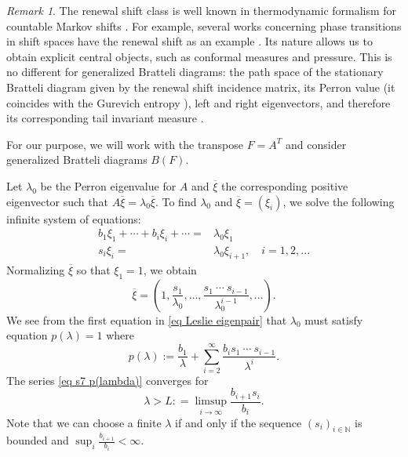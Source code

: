 \documentclass[11pt,reqno]{amsart}
\theoremstyle{definition}
\theoremstyle{remark}
\newtheorem{remark}[definition]{Remark}
\theoremstyle{plain}
\def\ol{\overline}
\newcommand{\N}{\mathbb N}
\newcommand{\be}{\begin{equation}}
\newcommand{\ee}{\end{equation}}
\newcommand{\ba}{\begin{aligned}}
\newcommand{\ea}{\end{aligned}}
\numberwithin{equation}{section}
\begin{document}
\begin{remark}
The renewal shift class \cite{Iommi2006} is well known in thermodynamic formalism for countable Markov shifts \cite{SarigTFCMS}. For example, several works concerning phase transitions in shift spaces have the renewal shift as an example \cite{Beltran_2021, BEFR2022, Raszeja2021, Sarig2001PT}. Its nature allows us to obtain explicit central objects, such as conformal measures and pressure. This is no different for generalized Bratteli diagrams: the path space of the stationary Bratteli diagram given by the renewal shift incidence matrix, its Perron value (it coincides with the Gurevich entropy \cite{Gurevichtopological1969, Gurevichshift1970}), left and right eigenvectors, and therefore its corresponding tail invariant measure \cite{BezuglyiJorgensenKarpelSanadhya2025}.
\end{remark}



For our purpose, we will work with the transpose $F = A^{T}$ and consider generalized Bratteli diagrams $B(F)$. 

Let $\lambda_0$ be the Perron eigenvalue for $A$ and $\ol \xi$ the corresponding positive eigenvector such that $A\ol\xi = \lambda_0 \ol\xi$. To find $\lambda_0$ and $\ol\xi = (\xi_i)$, we solve the following infinite system of equations:
\be\label{eq Leslie eigenpair}
\ba 
b_1 \xi_1 + \cdots + b_i \xi_i + \cdots = & \lambda_0 \xi_1\\
s_i \xi_i = & \lambda_0 \xi_{i+1}, \quad i = 1, 2, ...
\ea
\ee
Normalizing $\ol\xi$ so that $\xi_1 =1$, we obtain
\be\label{eq xi for Leslie}
\ol\xi = \left(1, \frac{s_1}{\lambda_0}, \ldots, \frac{s_1\ \cdots \ s_{i-1}}{\lambda_0^{i-1}}, \ldots\right).
\ee
We see from the first equation in 
\eqref{eq Leslie eigenpair} that $\lambda_0$ must satisfy equation $p(\lambda) =1$ where 
\be\label{eq s7 p(lambda)}
p(\lambda) := \dfrac{b_1}{\lambda}+ \sum_{i=2}^\infty \frac{b_i s_1\ \cdots\ s_{i-1} }{\lambda^{i}}.
\ee
The series \eqref{eq s7 p(lambda)} converges for 
\begin{equation}\label{eq: lambda_L}
    \lambda > L: =\limsup_{i\to \infty} \dfrac{b_{i+1}s_i}{b_i}.
\end{equation}
Note that we can choose a finite $\lambda$ if and only if the sequence $(s_i)_{i \in \N}$ is bounded and $\sup_i \frac{b_{i+1}}{b_i} < \infty$.
\end{document}
